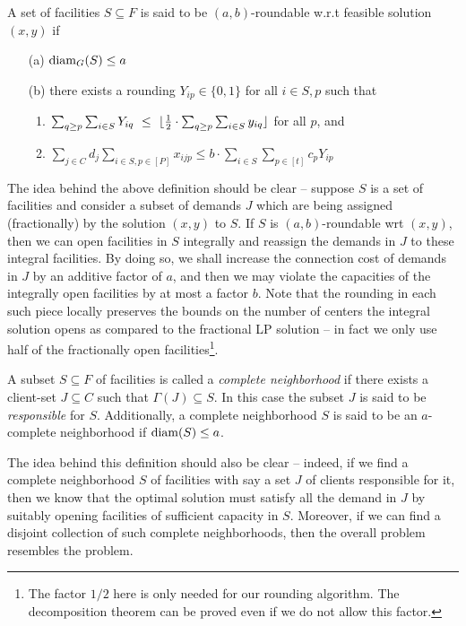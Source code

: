 \begin{definition}\label{def:rnding-mkc}
	A set of facilities $S\subseteq F$ is said to be $(a,b)$-roundable w.r.t feasible solution $(x,y)$ if
	\begin{itemize}%
		\item[(a)] $\mathrm{diam}_G(S) \leq a$
		\item[(b)] there exists a rounding $Y_{ip} \in \{0,1\}$ for all $i \in S, p$ such that
		\begin{enumerate}
			\item $\sum_{q \geq p} \sum_{i\in S} Y_{iq} ~\leq~ \lfloor\frac{1}{2} \cdot \sum_{q \geq p}\sum_{i\in S} y_{iq}\rfloor$ for all $p$, and
			\item $\sum_{j\in C} d_j \sum_{i\in S,p\in [P]} x_{ijp} \leq b\cdot \sum_{i\in S} \sum_{p\in [t]} c_p Y_{ip}$
		\end{enumerate}
	\end{itemize}
\end{definition}
The idea behind the above definition should be clear -- suppose $S$ is a set of facilities and consider a subset of demands $J$ which are being assigned (fractionally) by
the solution $(x,y)$ to $S$. If $S$ is $(a,b)$-roundable wrt $(x,y)$, then we can open facilities in $S$ integrally and reassign the demands in $J$ to these integral
facilities. By doing so, we shall increase the connection cost of demands in $J$ by an additive factor of $a$, and then we may violate the capacities of the integrally open
facilities by at most a factor $b$. Note that the rounding in each such piece locally preserves the bounds on the number of centers the integral solution opens as compared to the fractional LP solution -- in fact we only use half of the fractionally open facilities\footnote{The factor $1/2$ here is only needed for our rounding algorithm. The decomposition theorem can be proved even if we do not allow this factor.}.


\begin{definition} \label{def:comp-nbr}
	A subset $S\subseteq F$ of facilities is called a {\em complete neighborhood} if there exists a client-set $J\subseteq C$ such that $\Gamma(J) \subseteq S$.
	In this case the subset $J$ is said to be {\em responsible} for $S$. Additionally, a complete neighborhood $S$ is said to be an $a$-complete neighborhood if $\mathrm{diam}(S) \leq a$.
\end{definition}
The idea behind this definition should also be clear -- indeed, if we find a complete neighborhood $S$ of facilities with say a set $J$ of clients responsible for it, then we know that the optimal solution must satisfy all the demand in $J$ by suitably opening facilities of sufficient capacity in $S$. Moreover, if we can find a disjoint collection of such complete neighborhoods, then the overall problem resembles the \cckp problem. %

